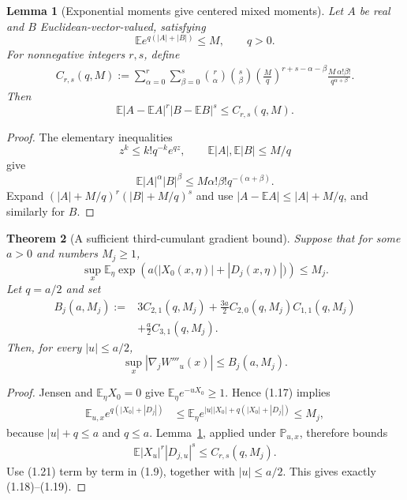 \documentclass[11pt]{article}
\newtheorem{theorem}{Theorem}[section]
\newtheorem{lemma}[theorem]{Lemma}
\theoremstyle{remark}
\begin{document}
\begin{lemma}[Exponential moments give centered mixed moments]
\label{lem:v17v1-mixed}
Let \(A\) be real and \(B\) Euclidean-vector-valued, satisfying
\[
 \mathbb E e^{q(|A|+|B|)}\leq M,\qquad q>0.             \tag{1.13}
\]
For nonnegative integers \(r,s\), define
\[
\begin{split}
 C_{r,s}(q,M):=
 \sum_{\alpha=0}^r\sum_{\beta=0}^s
 \binom r\alpha\binom s\beta
 \left(\frac Mq\right)^{r+s-\alpha-\beta}
 \frac{M\,\alpha!\beta!}{q^{\alpha+\beta}}.
                                                               \tag{1.14}
\end{split}
\]
Then
\[
 \mathbb E
 |A-\mathbb EA|^r|B-\mathbb EB|^s
 \leq C_{r,s}(q,M).                                 \tag{1.15}
\]
\end{lemma}

\begin{proof}
The elementary inequalities
\[
 z^k\leq k!q^{-k}e^{qz},\qquad
 \mathbb E|A|,\mathbb E|B|\leq M/q                    \tag{1.16}
\]
give
\[
 \mathbb E|A|^\alpha|B|^\beta
 \leq M\alpha!\beta!q^{-(\alpha+\beta)}.
\]
Expand
\((|A|+M/q)^r(|B|+M/q)^s\) and use
\(|A-\mathbb EA|\leq |A|+M/q\), and similarly for \(B\).
\end{proof}

\begin{theorem}[A sufficient third-cumulant gradient bound]
\label{thm:v17v1-gradient}
Suppose that for some \(a>0\) and numbers \(M_j\geq1\),
\[
 \sup_x\mathbb E_\eta
 \exp\left(a\bigl(|X_0(x,\eta)|+|D_j(x,\eta)|\bigr)\right)
 \leq M_j.                                         \tag{1.17}
\]
Let \(q=a/2\) and set
\[
\begin{split}
 B_j(a,M_j):={}&
 3C_{2,1}(q,M_j)
 +\frac{3a}{2}C_{2,0}(q,M_j)C_{1,1}(q,M_j)\\
 &+\frac a2C_{3,1}(q,M_j).                         \tag{1.18}
\end{split}
\]
Then, for every \(|u|\leq a/2\),
\[
 \sup_x|\nabla_jW'''_u(x)|
 \leq B_j(a,M_j).                                   \tag{1.19}
\]
\end{theorem}

\begin{proof}
Jensen and \(\mathbb E_\eta X_0=0\) give
\(\mathbb E_\eta e^{-uX_0}\geq1\).  Hence (1.17) implies
\[
\begin{split}
 \mathbb E_{u,x}
 e^{q(|X_0|+|D_j|)}
 &\leq
 \mathbb E_\eta
 e^{|u||X_0|+q(|X_0|+|D_j|)}
 \leq M_j,                                         \tag{1.20}
\end{split}
\]
because \(|u|+q\leq a\) and \(q\leq a\).
Lemma~\ref{lem:v17v1-mixed}, applied under
\({\mathbb P}_{u,x}\), therefore bounds
\[
\begin{split}
 \mathbb E|X_u|^r|D_{j,u}|^s
 \leq C_{r,s}(q,M_j).                               \tag{1.21}
\end{split}
\]
Use (1.21) term by term in (1.9), together with
\(|u|\leq a/2\).  This gives exactly (1.18)--(1.19).
\end{proof}
\end{document}
